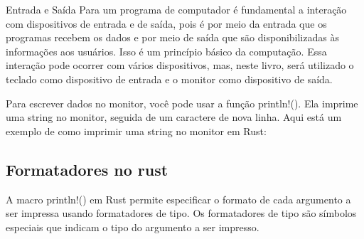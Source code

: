 \documentclass[12pt,a4paper,oneside]{abntex2}
\begin{document}
Entrada e Saída Para um programa de computador é fundamental a interação com dispositivos de entrada e de saída, pois é por meio da entrada que os programas recebem os dados e por meio de saída que são disponibilizadas às informações aos usuários. Isso é um princípio básico da computação. Essa interação pode ocorrer com vários dispositivos, mas, neste livro, será utilizado o teclado como dispositivo de entrada e o monitor como dispositivo de saída. 






Para escrever dados no monitor, você pode usar a função println!(). Ela imprime uma string no monitor, seguida de um caractere de nova linha. Aqui está um exemplo de como imprimir uma string no monitor em Rust:



\subsection{Formatadores no rust} 
A macro println!() em Rust permite especificar o formato de cada argumento a ser impressa usando formatadores de tipo. Os formatadores de tipo são símbolos especiais que indicam o tipo do argumento a ser impresso.
\end{document}
